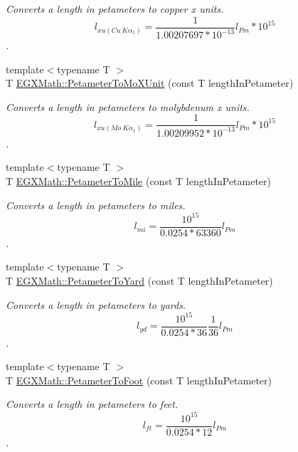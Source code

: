 \begin{DoxyCompactItemize}
\begin{DoxyCompactList}\small\item\em Converts a length in petameters to copper x units. \[ l_{xu(Cu\ K\alpha_1)}= \frac{1}{1.00207697*10^{-13}} l_{Pm} * 10^{15}\]. \end{DoxyCompactList}\item 
{\footnotesize template$<$typename T $>$ }\\T \mbox{\hyperlink{group___e_g_x_math-_conversions-_length_conversions-_s_i-_petameter-_non-_s_i_ga29419ba09bb33a7bc9e23f8cde2efea3}{E\+G\+X\+Math\+::\+Petameter\+To\+Mo\+X\+Unit}} (const T length\+In\+Petameter)
\begin{DoxyCompactList}\small\item\em Converts a length in petameters to molybdenum x units. \[ l_{xu(Mo\ K\alpha_1)}=\frac{1}{1.00209952*10^{-13}} l_{Pm} * 10^{15}\]. \end{DoxyCompactList}\item 
{\footnotesize template$<$typename T $>$ }\\T \mbox{\hyperlink{group___e_g_x_math-_conversions-_length_conversions-_s_i-_petameter-_imperial_ga3aa40ba19c1425ed3473c605cf7d4478}{E\+G\+X\+Math\+::\+Petameter\+To\+Mile}} (const T length\+In\+Petameter)
\begin{DoxyCompactList}\small\item\em Converts a length in petameters to miles. \[ l_{mi}=\frac{10^{15}}{0.0254 * 63360} l_{Pm} \]. \end{DoxyCompactList}\item 
{\footnotesize template$<$typename T $>$ }\\T \mbox{\hyperlink{group___e_g_x_math-_conversions-_length_conversions-_s_i-_petameter-_imperial_gadd453d20eef89db280c71397046d5dcd}{E\+G\+X\+Math\+::\+Petameter\+To\+Yard}} (const T length\+In\+Petameter)
\begin{DoxyCompactList}\small\item\em Converts a length in petameters to yards. \[ l_{yd}= \frac{10^{15}}{0.0254 * 36} \frac{1}{36} l_{Pm} \]. \end{DoxyCompactList}\item 
{\footnotesize template$<$typename T $>$ }\\T \mbox{\hyperlink{group___e_g_x_math-_conversions-_length_conversions-_s_i-_petameter-_imperial_gab1b79668a9de6a8374601bb44dde250d}{E\+G\+X\+Math\+::\+Petameter\+To\+Foot}} (const T length\+In\+Petameter)
\begin{DoxyCompactList}\small\item\em Converts a length in petameters to feet. \[ l_{ft}= \frac{10^{15}}{0.0254 * 12} l_{Pm} \]. \end{DoxyCompactList}\item 

\end{DoxyCompactItemize}
